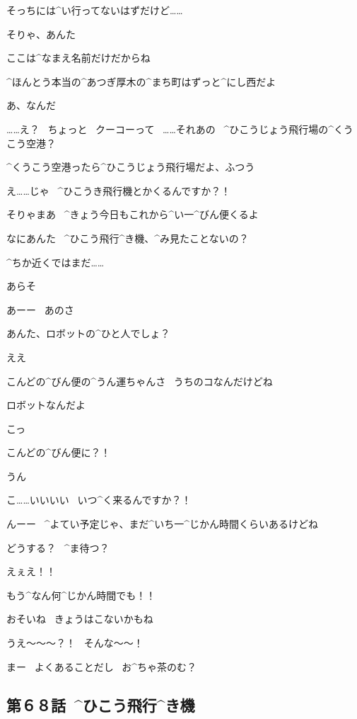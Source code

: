 \Alpha そっちには^{い}{行}ってないはずだけど……

\Person そりゃ、あんた

\Person ここは^{なまえ}{名前}だけだからね

\Person ^{ほんとう}{本当}の^{あつぎ}{厚木}の^{まち}{町}はずっと^{にし}{西}だよ

\Alpha あ、なんだ

\Alpha ……え？
\ ちょっと
\ クーコーって
\ ……それあの
\ ^{ひこうじょう}{飛行場}の^{くうこう}{空港}？

\Person ^{くうこう}{空港}ったら^{ひこうじょう}{飛行場}だよ、ふつう

\page
\Alpha え……じゃ
\ ^{ひこうき}{飛行機}とかくるんですか？！

\Person そりゃまあ
\ ^{きょう}{今日}もこれから^{い}{一}^{びん}{便}くるよ

\Person なにあんた
\ ^{ひこう}{飛行}^{き}{機}、^{み}{見}たことないの？

\Alpha ^{ちか}{近}くではまだ……

\Person あらそ

\Person あーー
\ あのさ

\page
\Person あんた、ロボットの^{ひと}{人}でしょ？

\Alpha ええ

\Person こんどの^{びん}{便}の^{うん}{運}ちゃんさ
\ うちのコなんだけどね

\Person ロボットなんだよ

\Alpha こっ

\Alpha こんどの^{びん}{便}に？！

\Person うん

\page
\Alpha こ……いいいい
\ いつ^{く}{来}るんですか？！

\Person んーー
\ ^{よてい}{予定}じゃ、まだ^{いち}{一}^{じかん}{時間}くらいあるけどね

\Person どうする？
\ ^{ま}{待}つ？

\Alpha えぇえ！！

\Alpha もう^{なん}{何}^{じかん}{時間}でも！！

\page[36]
\Person おそいね
\ きょうはこないかもね

\Alpha うえ〜〜〜？！
\ そんな〜〜！

\Person まー
\ よくあることだし
\ お^{ちゃ}{茶}のむ？


\subsection{第６８話\ ^{ひこう}{飛行}^{き}{機}}

